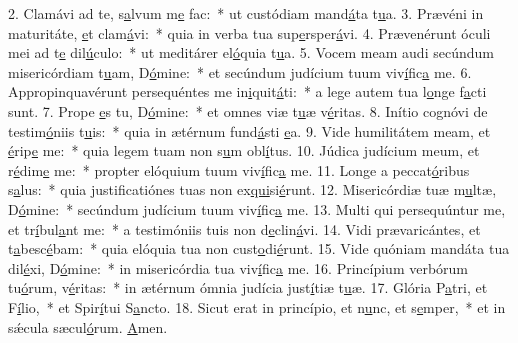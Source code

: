 2. Clamávi ad te, s\uline{a}lvum m\uline{e} fac:~* ut custódiam mand\uline{á}ta t\uline{u}a.
3. Prævéni in maturitáte, \uline{e}t clam\uline{á}vi:~* quia in verba tua sup\uline{e}rsper\uline{á}vi.
4. Prævenérunt óculi mei ad t\uline{e} dil\uline{ú}culo:~* ut meditárer el\uline{ó}quia t\uline{u}a.
5. Vocem meam audi secúndum misericórdiam t\uline{u}am, D\uline{ó}mine:~* et secúndum judícium tuum viv\uline{í}fic\uline{a} me.
6. Appropinquavérunt persequéntes me in\uline{i}quit\uline{á}ti:~* a lege autem tua l\uline{o}nge f\uline{a}cti sunt.
7. Prope \uline{e}s tu, D\uline{ó}mine:~* et omnes viæ t\uline{u}æ v\uline{é}ritas.
8. Inítio cognóvi de testim\uline{ó}niis t\uline{u}is:~* quia in ætérnum fund\uline{á}sti \uline{e}a.
9. Vide humilitátem meam, et \uline{é}rip\uline{e} me:~* quia legem tuam non s\uline{u}m obl\uline{í}tus.
10. Júdica judícium meum, et r\uline{é}dim\uline{e} me:~* propter elóquium tuum viv\uline{í}fic\uline{a} me.
11. Longe a peccat\uline{ó}ribus s\uline{a}lus:~* quia justificatiónes tuas non ex\uline{qui}si\uline{é}runt.
12. Misericórdiæ tuæ m\uline{u}ltæ, D\uline{ó}mine:~* secúndum judícium tuum viv\uline{í}fic\uline{a} me.
13. Multi qui persequúntur me, et tr\uline{í}bul\uline{a}nt me:~* a testimóniis tuis non d\uline{e}clin\uline{á}vi.
14. Vidi prævaricántes, et t\uline{a}besc\uline{é}bam:~* quia elóquia tua non cust\uline{o}di\uline{é}runt.
15. Vide quóniam mandáta tua dil\uline{é}xi, D\uline{ó}mine:~* in misericórdia tua viv\uline{í}fic\uline{a} me.
16. Princípium verbórum tu\uline{ó}rum, v\uline{é}ritas:~* in ætérnum ómnia judícia just\uline{í}tiæ t\uline{u}æ.
17. Glória P\uline{a}tri, et F\uline{í}lio,~* et Spir\uline{í}tui S\uline{a}ncto.
18. Sicut erat in princípio, et n\uline{u}nc, et s\uline{e}mper,~* et in sǽcula sæcul\uline{ó}rum. \uline{A}men.
